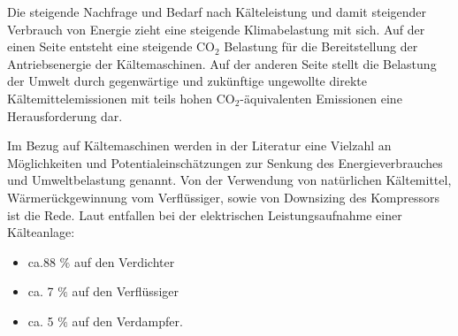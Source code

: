 Die steigende Nachfrage und Bedarf nach Kälteleistung und damit steigender Verbrauch von Energie zieht eine steigende Klimabelastung mit sich. Auf der einen Seite entsteht eine steigende CO$_{2}$ Belastung für die Bereitstellung der Antriebsenergie der Kältemaschinen. Auf der anderen Seite stellt die Belastung der Umwelt durch gegenwärtige und zukünftige ungewollte direkte Kältemittelemissionen mit teils hohen CO$_{2}$-äquivalenten Emissionen eine Herausforderung dar.





Im Bezug auf Kältemaschinen werden in der Literatur eine Vielzahl an Möglichkeiten und Potentialeinschätzungen zur Senkung des Energieverbrauches und Umweltbelastung genannt. Von der Verwendung von natürlichen Kältemittel, Wärmerückgewinnung vom Verflüssiger, sowie von Downsizing des Kompressors ist die Rede. Laut \citep{EnergieAgenturNRW2010} entfallen bei der elektrischen Leistungsaufnahme einer Kälteanlage:

\begin{itemize}
	\item ca.88 $\%$ auf den Verdichter
	\item ca. 7 $\%$ auf den Verflüssiger
	\item ca. 5 $\%$ auf den Verdampfer.
\end{itemize}

